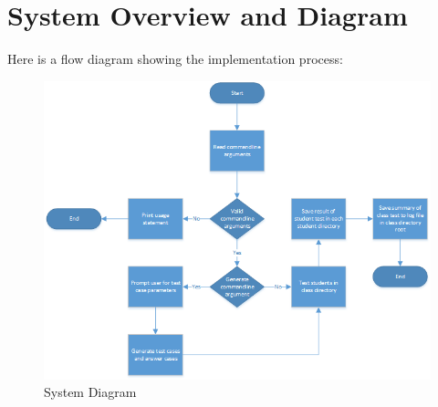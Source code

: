 \section{System Overview and Diagram}
Here is a flow diagram showing the implementation process:

\begin{figure}[tbh]
\begin{center}
\includegraphics[width=1\textwidth]{./SystemDiagram}
\end{center}
\caption{System Diagram \label{systemdiagram}}
\end{figure}




